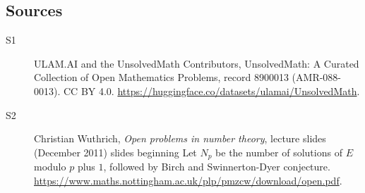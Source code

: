 \documentclass[11pt]{article}
\begin{document}
\subsection{Sources}
\begin{description}
\item[\hypertarget{source:8900013:1}{S1}] ULAM.AI and the UnsolvedMath Contributors, UnsolvedMath: A Curated Collection of Open Mathematics Problems, record 8900013 (AMR-088-0013). CC BY 4.0. \url{https://huggingface.co/datasets/ulamai/UnsolvedMath}.
\item[\hypertarget{source:8900013:2}{S2}] Christian Wuthrich, \emph{Open problems in number theory}, lecture slides (December 2011) slides beginning Let $N_p$ be the number of solutions of $E$ modulo $p$ plus $1$, followed by Birch and Swinnerton-Dyer conjecture. \url{https://www.maths.nottingham.ac.uk/plp/pmzcw/download/open.pdf}.
\end{description}
\label{end:8900013}
\end{document}
